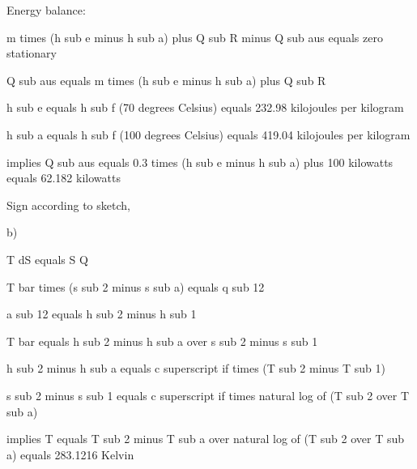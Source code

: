 Energy balance:

m times (h sub e minus h sub a) plus Q sub R minus Q sub aus equals zero stationary

Q sub aus equals m times (h sub e minus h sub a) plus Q sub R

h sub e equals h sub f (70 degrees Celsius) equals 232.98 kilojoules per kilogram

h sub a equals h sub f (100 degrees Celsius) equals 419.04 kilojoules per kilogram

implies Q sub aus equals 0.3 times (h sub e minus h sub a) plus 100 kilowatts equals 62.182 kilowatts

Sign according to sketch,

b)

T dS equals S Q

T bar times (s sub 2 minus s sub a) equals q sub 12

a sub 12 equals h sub 2 minus h sub 1

T bar equals h sub 2 minus h sub a over s sub 2 minus s sub 1

h sub 2 minus h sub a equals c superscript if times (T sub 2 minus T sub 1)

s sub 2 minus s sub 1 equals c superscript if times natural log of (T sub 2 over T sub a)

implies T equals T sub 2 minus T sub a over natural log of (T sub 2 over T sub a) equals 283.1216 Kelvin